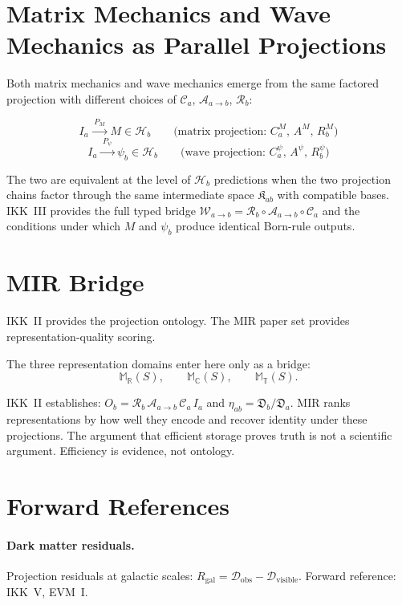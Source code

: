 \documentclass[11pt,a4paper,oneside]{article}
\newcommand{\Ia}{I_a}
\newcommand{\Hb}{\mathcal{H}_b}
\newcommand{\Kab}{\mathfrak{K}_{ab}}
\newcommand{\Ca}{\mathcal{C}_a}
\newcommand{\Aab}{\mathcal{A}_{a\to b}}
\newcommand{\Rb}{\mathcal{R}_b}
\newcommand{\Da}{\mathfrak{D}_a}
\newcommand{\Db}{\mathfrak{D}_b}
\newcommand{\etaab}{\eta_{ab}}
\newcommand{\psiab}{\psi_b}
\newcommand{\Wab}{\mathcal{W}_{a\to b}}
\newcommand{\RR}{\mathbb{R}}
\newcommand{\CC}{\mathbb{C}}
\newcommand{\TT}{\mathbb{T}}
\begin{document}
\section{Matrix Mechanics and Wave Mechanics as Parallel Projections}

Both matrix mechanics and wave mechanics emerge from the same factored projection with different choices of $\Ca$, $\Aab$, $\Rb$:

\[
\Ia \xrightarrow{\;P_M\;} M \in \Hb \qquad \text{(matrix projection: } C_a^M,\, A^M,\, R_b^M\text{)}
\]
\[
\Ia \xrightarrow{\;P_\psi\;} \psiab \in \Hb \qquad \text{(wave projection: } C_a^\psi,\, A^\psi,\, R_b^\psi\text{)}
\]

The two are equivalent at the level of $\Hb$ predictions when the two projection chains factor through the same intermediate space $\Kab$ with compatible bases. IKK~III provides the full typed bridge $\Wab = \Rb \circ \Aab \circ \Ca$ and the conditions under which $M$ and $\psiab$ produce identical Born-rule outputs.

\section{MIR Bridge}

IKK~II provides the projection ontology. The MIR paper set provides representation-quality scoring.

The three representation domains enter here only as a bridge:
\[
\mathbb{M}_\RR(S),\qquad \mathbb{M}_\CC(S),\qquad \mathbb{M}_\TT(S).
\]

IKK~II establishes: $O_b = \Rb\,\Aab\,\Ca\,\Ia$ and $\etaab = \Db/\Da$. MIR ranks representations by how well they encode and recover identity under these projections. The argument that efficient storage proves truth is not a scientific argument. Efficiency is evidence, not ontology.

\section{Forward References}

\paragraph{Dark matter residuals.} Projection residuals at galactic scales: $R_{\mathrm{gal}} = \mathcal{D}_{\mathrm{obs}} - \mathcal{D}_{\mathrm{visible}}$. Forward reference: IKK~V, EVM~I.
\end{document}
